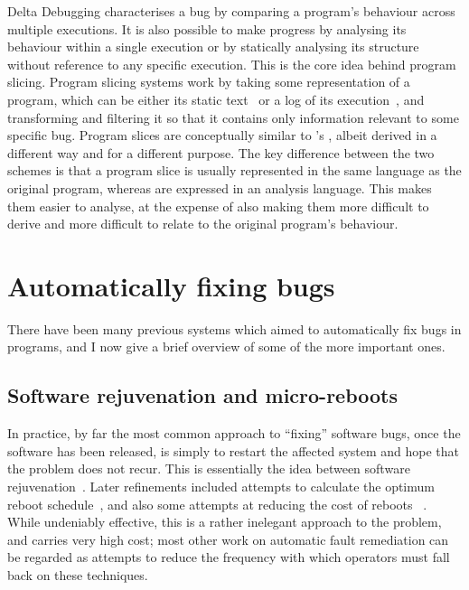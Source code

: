 Delta Debugging characterises a bug by comparing a program's behaviour
across multiple executions.  It is also possible to make progress by
analysing its behaviour within a single execution or by statically
analysing its structure without reference to any specific execution.
This is the core idea behind program slicing.  Program slicing systems
work by taking some representation of a program, which can be either
its static text~\cite{Weiser1981} or a log of its
execution~\cite{Agrawal1990a}, and transforming and filtering it so
that it contains only information relevant to some specific bug.
Program slices are conceptually similar to {\technique}'s
{\StateMachines}, albeit derived in a different way and for a
different purpose.  The key difference between the two schemes is that
a program slice is usually represented in the same language as the
original program, whereas {\StateMachines} are expressed in an
analysis language.  This makes them easier to analyse, at the expense
of also making them more difficult to derive and more difficult to
relate to the original program's behaviour.

\section{Automatically fixing bugs}

There have been many previous systems which aimed to automatically fix
bugs in programs, and I now give a brief overview of some of the more
important ones.

\subsection{Software rejuvenation and micro-reboots}

In practice, by far the most common approach to ``fixing'' software
bugs, once the software has been released, is simply to restart the
affected system and hope that the problem does not recur.  This is
essentially the idea between software rejuvenation~\cite{Huang1995}.
Later refinements included attempts to calculate the optimum reboot
schedule~\cite{Garg1998,Li2002,Vaidyanathan2001}, and also some
attempts at reducing the cost of reboots
~\cite{Candea2002,Patterson2002}.  While undeniably effective, this is
a rather inelegant approach to the problem, and carries very high
cost; most other work on automatic fault remediation can be regarded
as attempts to reduce the frequency with which operators must fall
back on these techniques.


